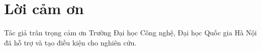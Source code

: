 \section*{Lời cảm ơn}
Tác giả trân trọng cảm ơn Trường Đại học Công nghệ, Đại học Quốc gia Hà Nội đã hỗ
trợ và tạo điều kiện cho nghiên cứu.

